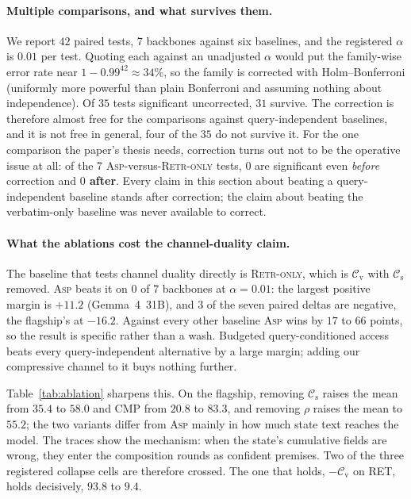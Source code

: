 \documentclass[10pt]{article}
\newcommand{\VnBackbones}{seven}
\providecommand{\VnBackbones}{--}
\providecommand{\VnTests}{--}
\providecommand{\VsigUncorr}{--}
\providecommand{\VsigHolm}{--}
\providecommand{\VretrHolmSurv}{--}
\providecommand{\VretrRawSurv}{--}
\providecommand{\VretrNeg}{--}
\providecommand{\VAspCmpAll}{--}
\providecommand{\VNoCsCmpAll}{--}
\renewcommand{\VnBackbones}{7}
\renewcommand{\VnTests}{42}
\renewcommand{\VsigUncorr}{35}
\renewcommand{\VsigHolm}{31}
\renewcommand{\VretrHolmSurv}{0}
\renewcommand{\VretrRawSurv}{0}
\renewcommand{\VretrNeg}{3}
\renewcommand{\VAspCmpAll}{20.8}
\renewcommand{\VNoCsCmpAll}{83.3}
\theoremstyle{definition}
\theoremstyle{plain}
\newcommand{\ASP}{\textsc{Asp}}
\newcommand{\cs}{\mathcal{C}_{\mathrm{s}}}
\newcommand{\cv}{\mathcal{C}_{\mathrm{v}}}
\begin{document}
\paragraph{Multiple comparisons, and what survives them.} We report $\VnTests{}$ paired tests, \VnBackbones{} backbones against six baselines, and the registered $\alpha$ is $0.01$ per
test. Quoting each against an unadjusted $\alpha$ would put the family-wise error rate near
$1-0.99^{\VnTests{}}\approx34\%$, so the family is corrected with Holm--Bonferroni (uniformly
more powerful than plain Bonferroni and assuming nothing about independence). Of
$\VsigUncorr{}$ tests significant uncorrected, $\VsigHolm{}$ survive. The correction is
therefore almost free for the comparisons against query-independent baselines, and it is not
free in general, four of the $\VsigUncorr{}$ do not survive it. For the one comparison the
paper's thesis needs, correction turns out not to be the operative issue at all: of the
\VnBackbones{} \ASP{}-versus-\textsc{Retr-only} tests, $\VretrRawSurv{}$ are significant even
\emph{before} correction and \textbf{$\VretrHolmSurv{}$ after}. Every claim in this section
about beating a query-independent baseline stands after correction; the claim about beating the
verbatim-only baseline was never available to correct.

\paragraph{What the ablations cost the channel-duality claim.} The baseline that tests channel
duality directly is \textsc{Retr-only}, which is $\cv$ with $\cs$ removed. \ASP{} beats it on
\VretrRawSurv{} of \VnBackbones{} backbones at $\alpha{=}0.01$: the largest positive margin is
$+11.2$ (Gemma~4~31B), and $\VretrNeg{}$ of the seven paired deltas are negative, the flagship's
at $-16.2$. Against every other baseline \ASP{} wins by $17$ to $66$ points, so the result is
specific rather than a wash. Budgeted query-conditioned access beats every query-independent
alternative by a large margin; adding our compressive channel to it buys nothing further.

Table~\ref{tab:ablation} sharpens this. On the flagship, removing $\cs$ raises the mean from
$35.4$ to $58.0$ and CMP from $\VAspCmpAll{}$ to $\VNoCsCmpAll{}$, and removing $\rho$ raises
the mean to $55.2$; the two variants differ from \ASP{} mainly in how much state text reaches
the model. The traces show the mechanism: when the state's cumulative fields are wrong, they
enter the composition rounds as confident premises. Two of the three registered collapse cells
are therefore crossed. The one that holds, $-\cv$ on RET, holds decisively, $93.8$ to $9.4$.
\end{document}
